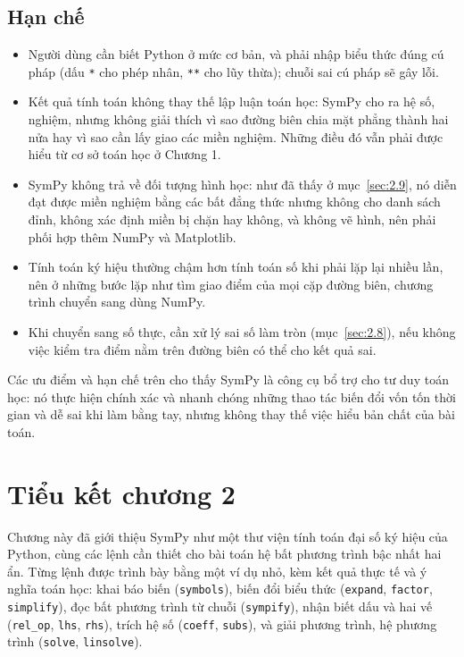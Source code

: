 \documentclass[12pt,a4paper]{report}
\begin{document}
\subsection*{Hạn chế}

\begin{itemize}
\item Người dùng cần biết Python ở mức cơ bản, và phải nhập biểu thức đúng cú pháp (dấu \texttt{*} cho phép nhân, \texttt{**} cho lũy thừa); chuỗi sai cú pháp sẽ gây lỗi.
\item Kết quả tính toán không thay thế lập luận toán học: SymPy cho ra hệ số, nghiệm, nhưng không giải thích vì sao đường biên chia mặt phẳng thành hai nửa hay vì sao cần lấy giao các miền nghiệm. Những điều đó vẫn phải được hiểu từ cơ sở toán học ở Chương 1.
\item SymPy không trả về đối tượng hình học: như đã thấy ở mục~\ref{sec:2.9}, nó diễn đạt được miền nghiệm bằng các bất đẳng thức nhưng không cho danh sách đỉnh, không xác định miền bị chặn hay không, và không vẽ hình, nên phải phối hợp thêm NumPy và Matplotlib.
\item Tính toán ký hiệu thường chậm hơn tính toán số khi phải lặp lại nhiều lần, nên ở những bước lặp như tìm giao điểm của mọi cặp đường biên, chương trình chuyển sang dùng NumPy.
\item Khi chuyển sang số thực, cần xử lý sai số làm tròn (mục~\ref{sec:2.8}), nếu không việc kiểm tra điểm nằm trên đường biên có thể cho kết quả sai.
  
\end{itemize}

\begin{notebox}
Các ưu điểm và hạn chế trên cho thấy SymPy là công cụ bổ trợ cho tư duy toán học: nó thực hiện chính xác và nhanh chóng những thao tác biến đổi vốn tốn thời gian và dễ sai khi làm bằng tay, nhưng không thay thế việc hiểu bản chất của bài toán.
\end{notebox}

\section{Tiểu kết chương 2}
\label{sec:2.13}

Chương này đã giới thiệu SymPy như một thư viện tính toán đại số ký hiệu của Python, cùng các lệnh cần thiết cho bài toán hệ bất phương trình bậc nhất hai ẩn. Từng lệnh được trình bày bằng một ví dụ nhỏ, kèm kết quả thực tế và ý nghĩa toán học: khai báo biến (\texttt{symbols}), biến đổi biểu thức (\texttt{expand}, \texttt{factor}, \texttt{simplify}), đọc bất phương trình từ chuỗi (\texttt{sympify}), nhận biết dấu và hai vế (\texttt{rel\_op}, \texttt{lhs}, \texttt{rhs}), trích hệ số (\texttt{coeff}, \texttt{subs}), và giải phương trình, hệ phương trình (\texttt{solve}, \texttt{linsolve}).
\end{document}
